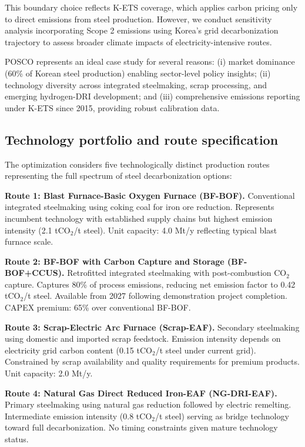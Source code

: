 \documentclass[preprint,1p,authoryear]{elsarticle}
\begin{document}
This boundary choice reflects K-ETS coverage, which applies carbon pricing only to direct emissions from steel production. However, we conduct sensitivity analysis incorporating Scope 2 emissions using Korea's grid decarbonization trajectory to assess broader climate impacts of electricity-intensive routes.

POSCO represents an ideal case study for several reasons: (i) market dominance (60\% of Korean steel production) enabling sector-level policy insights; (ii) technology diversity across integrated steelmaking, scrap processing, and emerging hydrogen-DRI development; and (iii) comprehensive emissions reporting under K-ETS since 2015, providing robust calibration data.

\subsection{Technology portfolio and route specification}

The optimization considers five technologically distinct production routes representing the full spectrum of steel decarbonization options:

\textbf{Route 1: Blast Furnace-Basic Oxygen Furnace (BF-BOF).} Conventional integrated steelmaking using coking coal for iron ore reduction. Represents incumbent technology with established supply chains but highest emission intensity (2.1 tCO$_2$/t steel). Unit capacity: 4.0 Mt/y reflecting typical blast furnace scale.

\textbf{Route 2: BF-BOF with Carbon Capture and Storage (BF-BOF+CCUS).} Retrofitted integrated steelmaking with post-combustion CO$_2$ capture. Captures 80\% of process emissions, reducing net emission factor to 0.42 tCO$_2$/t steel. Available from 2027 following demonstration project completion. CAPEX premium: 65\% over conventional BF-BOF.

\textbf{Route 3: Scrap-Electric Arc Furnace (Scrap-EAF).} Secondary steelmaking using domestic and imported scrap feedstock. Emission intensity depends on electricity grid carbon content (0.15 tCO$_2$/t steel under current grid). Constrained by scrap availability and quality requirements for premium products. Unit capacity: 2.0 Mt/y.

\textbf{Route 4: Natural Gas Direct Reduced Iron-EAF (NG-DRI-EAF).} Primary steelmaking using natural gas reduction followed by electric remelting. Intermediate emission intensity (0.8 tCO$_2$/t steel) serving as bridge technology toward full decarbonization. No timing constraints given mature technology status.
\end{document}
